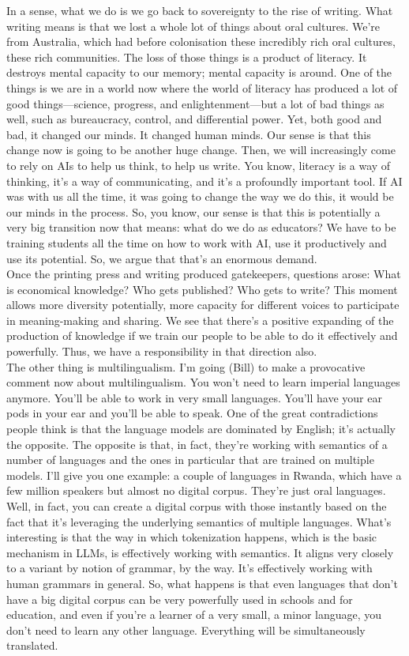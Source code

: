 \documentclass[english]{textolivre}
\begin{document}
{    In a sense, what we do is we go back to sovereignty to the rise of writing. What writing means is that we lost a whole lot of things about oral cultures. We’re from Australia, which had before colonisation these incredibly rich oral cultures, these rich communities. The loss of those things is a product of literacy. It destroys mental capacity to our memory; mental capacity is around. One of the things is we are in a world now where the world of literacy has produced a lot of good things—science, progress, and enlightenment—but a lot of bad things as well, such as bureaucracy, control, and differential power. Yet, both good and bad, it changed our minds. It changed human minds. Our sense is that this change now is going to be another huge change. Then, we will increasingly come to rely on AIs to help us think, to help us write. You know, literacy is a way of thinking, it’s a way of communicating, and it’s a profoundly important tool. If AI was with us all the time, it was going to change the way we do this, it would be our minds in the process. So, you know, our sense is that this is potentially a very big transition now that means: what do we do as educators? We have to be training students all the time on how to work with AI, use it productively and use its potential. So, we argue that that’s an enormous demand.\\
    Once the printing press and writing produced gatekeepers, questions arose: What is economical knowledge? Who gets published? Who gets to write? This moment allows more diversity potentially, more capacity for different voices to participate in meaning-making and sharing. We see that there’s a positive expanding of the production of knowledge if we train our people to be able to do it effectively and powerfully. Thus, we have a responsibility in that direction also.\\
    The other thing is multilingualism. I’m going (Bill) to make a provocative comment now about multilingualism. You won’t need to learn imperial languages anymore. You’ll be able to work in very small languages. You’ll have your ear pods in your ear and you’ll be able to speak. One of the great contradictions people think is that the language models are dominated by English; it’s actually the opposite. The opposite is that, in fact, they’re working with semantics of a number of languages and the ones in particular that are trained on multiple models. I’ll give you one example: a couple of languages in Rwanda, which have a few million speakers but almost no digital corpus. They’re just oral languages. Well, in fact, you can create a digital corpus with those instantly based on the fact that it’s leveraging the underlying semantics of multiple languages. What’s interesting is that the way in which tokenization happens, which is the basic mechanism in LLMs, is effectively working with semantics. It aligns very closely to a variant by notion of grammar, by the way. It’s effectively working with human grammars in general. So, what happens is that even languages that don’t have a big digital corpus can be very powerfully used in schools and for education, and even if you’re a learner of a very small, a minor language, you don’t need to learn any other language. Everything will be simultaneously translated. \\
}
\end{document}
